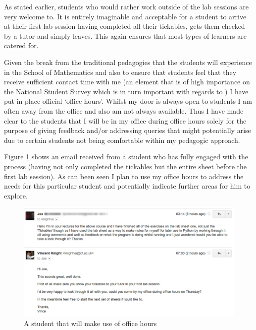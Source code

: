 \documentclass{article}
\begin{document}
As stated earlier, students who would rather work outside of the lab sessions are very welcome to. It is entirely imaginable and acceptable for a student to arrive at their first lab session having completed all their tickables, gets them checked by a tutor and simply leaves. This again ensures that most types of learners are catered for.

Given the break from the traditional pedagogies that the students will experience in the School of Mathematics and also to ensure that students feel that they receive sufficient contact time with me (an element that is of high importance on the National Student Survey which is in turn important with regards to \cite{cardiff_university_way_2013}) I have put in place official `office hours'. Whilst my door is always open to students I am often away from the office and also am not always available. Thus I have made clear to the students that I will be in my office during office hours solely for the purpose of giving feedback and/or addressing queries that might potentially arise due to certain students not being comfortable within my pedagogic approach.

Figure \ref{emailaboutofficehours} shows an email received from a student who has fully engaged with the process (having not only completed the tickables but the entire sheet before the first lab session). As can been seen I plan to use my office hours to address the needs for this particular student and potentially indicate further areas for him to explore.

\begin{figure}[htdp]
\begin{center}
\includegraphics[width=14cm]{Images/emailaboutofficehours.pdf}
\end{center}
\caption{A student that will make use of office hours}\label{emailaboutofficehours}
\end{figure}
\end{document}

